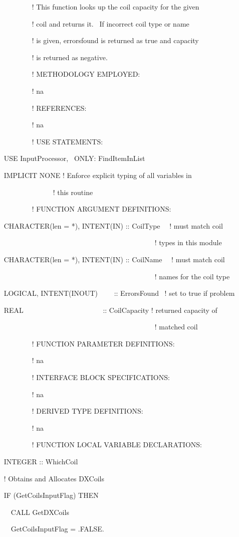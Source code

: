 ~~~~~~~~~ ! This function looks up the coil capacity for the given

~~~~~~~~~ ! coil and returns it.~ If incorrect coil type or name

~~~~~~~~~ ! is given, errorsfound is returned as true and capacity

~~~~~~~~~ ! is returned as negative.

~~~~~~~~~ ! METHODOLOGY EMPLOYED:

~~~~~~~~~ ! na

~~~~~~~~~ ! REFERENCES:

~~~~~~~~~ ! na

~~~~~~~~~ ! USE STATEMENTS:

~ USE InputProcessor,~ ONLY: FindItemInList

~ IMPLICIT NONE ! Enforce explicit typing of all variables in

~~~~~~~~~~~~~~~ ! this routine

~~~~~~~~~ ! FUNCTION ARGUMENT DEFINITIONS:

~ CHARACTER(len = *), INTENT(IN) :: CoilType~~ ! must match coil

~~~~~~~~~~ ~~~~~~~~~~~~~~~~~~~~~~~~~~~~~~~~~~! types in this module

~ CHARACTER(len = *), INTENT(IN) :: CoilName~~ ! must match coil

~~~~~~~~~~~~~~~~~~~~~~~~~~~~~~~~~~~~~~~~~~~~ ! names for the coil type

~ LOGICAL, INTENT(INOUT)~~~~ :: ErrorsFound~ ! set to true if problem

~ REAL~~~~~~~~~~~~~~~~~~~~~~ :: CoilCapacity ! returned capacity of

~~~~~~~~~~~~~~~~~~~~~~~~~~~~~~~~~~~~~~~~~~~~ ! matched coil

~~~~~~~~~ ! FUNCTION PARAMETER DEFINITIONS:

~~~~~~~~~ ! na

~~~~~~~~~ ! INTERFACE BLOCK SPECIFICATIONS:

~~~~~~~~~ ! na

~ ~~~~~~~~! DERIVED TYPE DEFINITIONS:

~~~~~~~~~ ! na

~~~~~~~~~ ! FUNCTION LOCAL VARIABLE DECLARATIONS:

~ INTEGER :: WhichCoil

~ ! Obtains and Allocates DXCoils

~ IF (GetCoilsInputFlag) THEN

~~~ CALL GetDXCoils

~~~ GetCoilsInputFlag = .FALSE.

